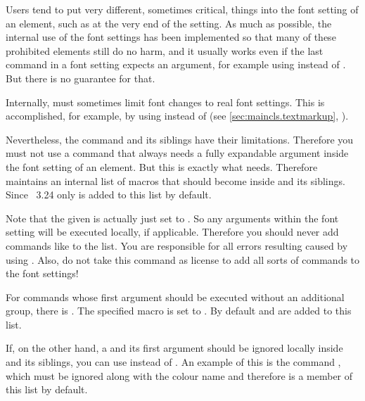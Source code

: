 Users tend to put very different, sometimes critical, things into the font
setting of an element, such as  at the very end of the
setting. As much as possible, the internal use of the font settings has been
implemented so that many of these prohibited elements still do no harm, and it
usually works even if the last command in a font setting expects an argument,
for example using  instead of . But there is no
guarantee for that.

Internally, \KOMAScript{} must sometimes limit font changes to real font
settings. This is accomplished, for example, by using
%
%
%
%
 instead of 
(see \autoref{sec:maincls.textmarkup},
).

Nevertheless, the  command and its
siblings have their limitations. Therefore you must not use a command that
always needs a fully expandable argument inside the font setting of an
element. But this is exactly what  needs.
Therefore \KOMAScript{} maintains an internal list of macros that
should become  inside  and
its siblings. Since \KOMAScript~3.24 only  is added to
this list by default.

Note that the given  is actually just set to . So
any arguments within the font setting will be executed locally, if applicable.
Therefore you should never add commands like  to the list.
You are responsible for all errors resulting caused by using
. Also, do not take this command as license to
add all sorts of commands to the font settings!

For commands whose first argument should be executed without an
additional group, there is . The specified
macro is set to . By default  and
 are added to this list.

If, on the other hand, a  and its first argument
should be ignored locally inside  and
its siblings, you can use  instead of
. An example of this is the command
, which must be ignored along with the colour name and therefore
is a member of this list by default.

